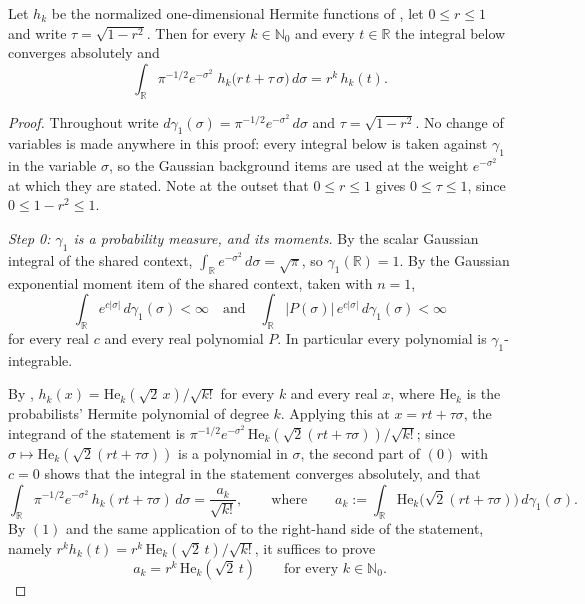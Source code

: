 \begin{lemma}
Let $h_k$ be the normalized one-dimensional Hermite functions of
, let $0 \leq r \leq 1$ and write
$\tau = \sqrt{1-r^2}$.  Then for every $k \in \mathbb{N}_0$ and every
$t \in \mathbb{R}$ the integral below converges absolutely and
\[
  \int_{\mathbb{R}} \pi^{-1/2} e^{-\sigma^2}\;
      h_k\bigl(r\,t + \tau\,\sigma\bigr)\, d\sigma
    = r^k\, h_k(t) .
\]
\end{lemma}
\begin{proof}
Throughout write $d\gamma_1(\sigma) = \pi^{-1/2}e^{-\sigma^2}\,d\sigma$ and
$\tau = \sqrt{1-r^2}$.  No change of variables is made anywhere in this proof:
every integral below is taken against $\gamma_1$ in the variable $\sigma$, so the
Gaussian background items are used at the weight $e^{-\sigma^2}$ at which they
are stated.  Note at the outset that $0 \leq r \leq 1$ gives
$0 \leq \tau \leq 1$, since $0 \leq 1 - r^2 \leq 1$.

\emph{Step 0: $\gamma_1$ is a probability measure, and its moments.}
By the scalar Gaussian integral of the shared context,
$\int_{\mathbb{R}} e^{-\sigma^2}\,d\sigma = \sqrt\pi$, so
$\gamma_1(\mathbb{R}) = 1$.  By the Gaussian exponential moment item of the
shared context, taken with $n = 1$,
\begin{equation*}
  \int_{\mathbb{R}} e^{c|\sigma|}\, d\gamma_1(\sigma) < \infty
  \quad\text{and}\quad
  \int_{\mathbb{R}} |P(\sigma)|\, e^{c|\sigma|}\, d\gamma_1(\sigma) < \infty
  \tag{0}
\end{equation*}
for every real $c$ and every real polynomial $P$.  In particular every
polynomial is $\gamma_1$-integrable.

By , $h_k(x) = \mathrm{He}_k(\sqrt2\,x)/\sqrt{k!}$ for every $k$
and every real $x$, where $\mathrm{He}_k$ is the probabilists' Hermite polynomial
of degree $k$.  Applying this at $x = r t + \tau\sigma$, the integrand of the
statement is $\pi^{-1/2}e^{-\sigma^2}\,\mathrm{He}_k(\sqrt2(rt+\tau\sigma))/\sqrt{k!}$;
since $\sigma \mapsto \mathrm{He}_k(\sqrt2(rt+\tau\sigma))$ is a polynomial in
$\sigma$, the second part of $(0)$ with $c = 0$ shows that the integral in the
statement converges absolutely, and that
\begin{equation*}
  \int_{\mathbb{R}} \pi^{-1/2}e^{-\sigma^2}\,h_k(rt+\tau\sigma)\,d\sigma
    = \frac{a_k}{\sqrt{k!}},
  \qquad\text{where}\qquad
  a_k := \int_{\mathbb{R}} \mathrm{He}_k\bigl(\sqrt2(rt+\tau\sigma)\bigr)\, d\gamma_1(\sigma).
  \tag{1}
\end{equation*}
By $(1)$ and the same application of  to the right-hand side of
the statement, namely $r^k h_k(t) = r^k\,\mathrm{He}_k(\sqrt2\,t)/\sqrt{k!}$, it
suffices to prove
\begin{equation*}
  a_k = r^k\,\mathrm{He}_k(\sqrt2\,t)
  \qquad\text{for every } k \in \mathbb{N}_0 .
  \tag{$\ast$}
\end{equation*}


\end{proof}
